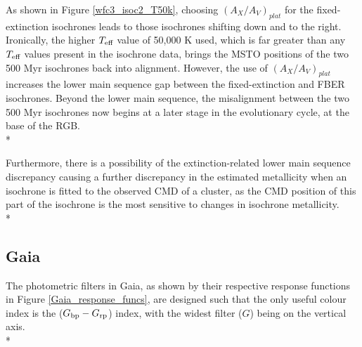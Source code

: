\documentclass[12pt, a4paper]{report}
\begin{document}
As shown in Figure \ref{wfc3_isoc2_T50k}, choosing $(A_{X}/A_{V})_{plat}$ for the fixed-extinction isochrones leads to those isochrones shifting down and to the right. Ironically, the higher $T_{\textnormal{eff}}$ value of 50,000 K used, which is far greater than any $T_{\textnormal{eff}}$ values present in the isochrone data, brings the MSTO positions of the two 500 Myr isochrones back into alignment. However, the use of $(A_{X}/A_{V})_{plat}$ increases the lower main sequence gap between the fixed-extinction and FBER isochrones. Beyond the lower main sequence, the misalignment between the two 500 Myr isochrones now begins at a later stage in the evolutionary cycle, at the base of the RGB. \\*

Furthermore, there is a possibility of the extinction-related lower main sequence discrepancy causing a further discrepancy in the estimated metallicity when an isochrone is fitted to the observed CMD of a cluster, as the CMD position of this part of the isochrone is the most sensitive to changes in isochrone metallicity.\\*

\subsection{Gaia} \label{Gaia_isoc}

The photometric filters in Gaia, as shown by their respective response functions in Figure \ref{Gaia_response_funcs}, are designed such that the only useful colour index is the ($G_{\textnormal{bp}}-G_{\textnormal{rp}}$) index, with the widest filter ($G$) being on the vertical axis.\\*
\end{document}
